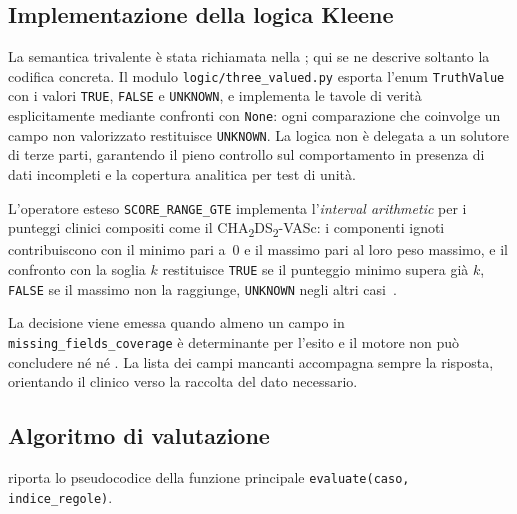\subsection{Implementazione della logica Kleene}

La semantica trivalente è stata richiamata nella ;
qui se ne descrive soltanto la codifica concreta. Il modulo
\texttt{logic/three\_valued.py} esporta l'enum \texttt{TruthValue} con i
valori \texttt{TRUE}, \texttt{FALSE} e \texttt{UNKNOWN}, e implementa le
tavole di verità esplicitamente mediante confronti con \texttt{None}: ogni
comparazione che coinvolge un campo non valorizzato restituisce
\texttt{UNKNOWN}. La logica non è delegata a un solutore di terze parti,
garantendo il pieno controllo sul comportamento in presenza di dati
incompleti e la copertura analitica per test di unità.

L'operatore esteso \texttt{SCORE\_RANGE\_GTE} implementa l'\emph{interval
arithmetic} per i punteggi clinici compositi come il CHA\textsubscript{2}DS\textsubscript{2}-VASc: i
componenti ignoti contribuiscono con il minimo pari a~0 e il massimo pari al
loro peso massimo, e il confronto con la soglia $k$ restituisce \texttt{TRUE}
se il punteggio minimo supera già $k$, \texttt{FALSE} se il massimo non la
raggiunge, \texttt{UNKNOWN} negli altri casi~\cite{deStefano2014cha2ds2}.

La decisione  viene emessa quando almeno un
campo in \texttt{missing\_fields\_coverage} è determinante per l'esito e il
motore non può concludere né  né
. La lista dei campi mancanti accompagna sempre
la risposta, orientando il clinico verso la raccolta del dato necessario.

\subsection{Algoritmo di valutazione}

\begin{sloppypar}
 riporta lo pseudocodice della funzione principale
\texttt{evaluate(caso,\allowbreak{} indice\_regole)}.
\end{sloppypar}

